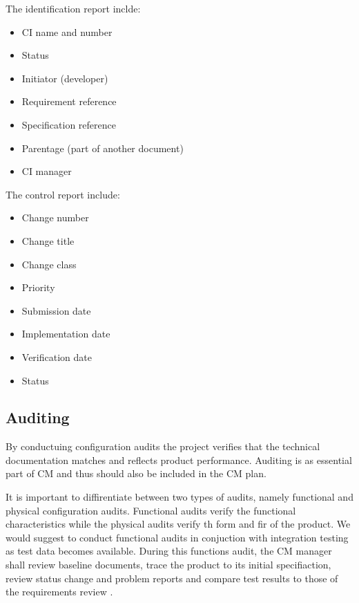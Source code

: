 \documentclass[a4paper]{article}
\begin{document}
The identification report inclde:
\begin{itemize}
  \item CI name and number
  \item Status
  \item Initiator (developer)
  \item Requirement reference
  \item Specification reference
  \item Parentage (part of another document)
  \item CI manager
\end{itemize}

The control report include:
\begin{itemize}
  \item Change number
  \item Change title
  \item Change class
  \item Priority
  \item Submission date
  \item Implementation date
  \item Verification date
  \item Status
\end{itemize}

\subsection{Auditing}

By conductuing configuration audits the project verifies that the technical documentation matches and reflects product performance. Auditing is as essential part of CM and thus should also be included in the CM plan.

It is important to diffirentiate between two types of audits, namely functional and physical configuration audits. Functional audits verify the functional characteristics while the physical audits verify th form and fir of the product. We would suggest to conduct functional audits in conjuction with integration testing as test data becomes available. During this functions audit, the CM manager shall review baseline documents, trace the product to its initial specifiaction, review status change and problem reports and compare test results to those of the requirements review \cite{daniels}. 
\end{document}
